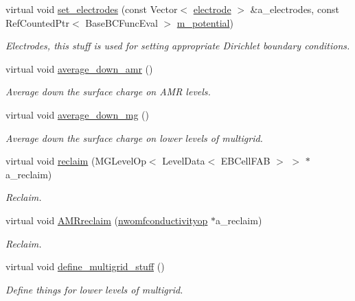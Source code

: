 \begin{DoxyCompactItemize}
virtual void \hyperlink{classnwomfconductivityopfactory_ac78dc23dc1253ec07f85e9ff2932f7fb}{set\+\_\+electrodes} (const Vector$<$ \hyperlink{classelectrode}{electrode} $>$ \&a\+\_\+electrodes, const Ref\+Counted\+Ptr$<$ Base\+B\+C\+Func\+Eval $>$ \hyperlink{classnwomfconductivityopfactory_aa49cb695d778559971ee983223628782}{m\+\_\+potential})
\begin{DoxyCompactList}\small\item\em Electrodes, this stuff is used for setting appropriate Dirichlet boundary conditions. \end{DoxyCompactList}\item 
virtual void \hyperlink{classnwomfconductivityopfactory_a1664bf7655326f0c32a36853e960091c}{average\+\_\+down\+\_\+amr} ()
\begin{DoxyCompactList}\small\item\em Average down the surface charge on A\+MR levels. \end{DoxyCompactList}\item 
virtual void \hyperlink{classnwomfconductivityopfactory_a529cc46c530f7e4662abd5d889aaa2fb}{average\+\_\+down\+\_\+mg} ()
\begin{DoxyCompactList}\small\item\em Average down the surface charge on lower levels of multigrid. \end{DoxyCompactList}\item 
virtual void \hyperlink{classnwomfconductivityopfactory_a432bebf41fe2b8ad40d68c21dfcf0e58}{reclaim} (M\+G\+Level\+Op$<$ Level\+Data$<$ E\+B\+Cell\+F\+AB $>$ $>$ $\ast$a\+\_\+reclaim)
\begin{DoxyCompactList}\small\item\em Reclaim. \end{DoxyCompactList}\item 
virtual void \hyperlink{classnwomfconductivityopfactory_a808c5c8640db31046735cd7e9465532c}{A\+M\+Rreclaim} (\hyperlink{classnwomfconductivityop}{nwomfconductivityop} $\ast$a\+\_\+reclaim)
\begin{DoxyCompactList}\small\item\em Reclaim. \end{DoxyCompactList}\item 
virtual void \hyperlink{classnwomfconductivityopfactory_a9d7be48e4f4503cc0b099b28b1711821}{define\+\_\+multigrid\+\_\+stuff} ()
\begin{DoxyCompactList}\small\item\em Define things for lower levels of multigrid. \end{DoxyCompactList}\item 

\end{DoxyCompactItemize}
